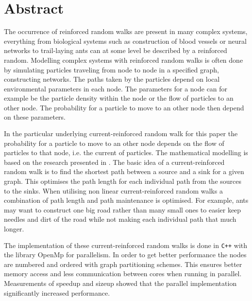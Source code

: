 \section*{Abstract}
\label{sec:abstract}

The occurrence of reinforced random walks are present in many complex systems, everything from biological systems such as construction of blood vessels or neural networks to trail-laying ants can at some level be described by a reinforced random. Modelling complex systems with reinforced random walks is often done by simulating particles traveling from node to node in a specified graph, constructing networks. The paths taken by the particles depend on local environmental parameters in each node. The parameters for a node can for example be the particle density within the node or the flow of particles to an other node. The probability for a particle to move to an other node then depend on these parameters.

In the particular underlying current-reinforced random walk for this paper the probability for a particle to move to an other node depends on the flow of particles to that node, i.e. the current of particles. The mathematical modelling is based on the research presented in \cite{Sumpter}. The basic idea of a current-reinforced random walk is to find the shortest path between a source and a sink for a given graph. This optimises the path length for each individual path from the sources to the sinks. When utilising non linear current-reinforced random walks a combination of path length and path maintenance is optimised. For example, ants may want to construct one big road rather than many small ones to easier keep needles and dirt of the road while not making each individual path that much longer.

The implementation of these current-reinforced random walks is done in \texttt{C++} with the library OpenMp for parallelism. In order to get better performance the nodes are numbered and ordered with graph partitioning schemes. This ensures better memory access and less communication between cores when running in parallel. Measurements of speedup and sizeup showed that the parallel implementation significantly increased performance. 